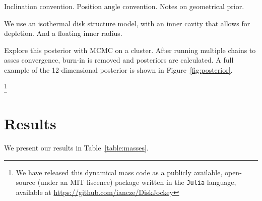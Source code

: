 \documentclass[twocolumn]{aastex6}
\begin{document}

Inclination convention. Position angle convention. Notes on geometrical prior.

We use an isothermal disk structure model, with an inner cavity that allows for depletion. And a floating inner radius.


Explore this posterior with MCMC on a cluster. After running multiple chains to asses convergence, burn-in is removed and posteriors are calculated. A full example of the 12-dimensional posterior is shown in Figure~\ref{fig:posterior}.

\footnote{We have released this dynamical mass code as a publicly available, open-source (under an MIT liscence) package written in the \texttt{Julia} language, available at \url{https://github.com/iancze/DiskJockey}}

\section{Results}

We present our results in Table~\ref{table:masses}.

\end{document}
